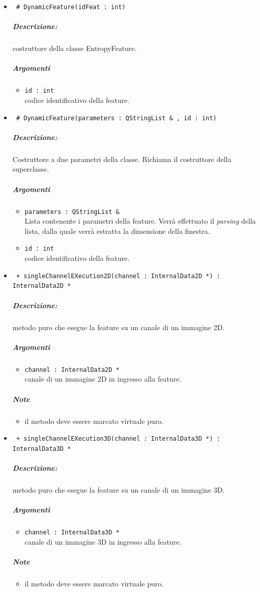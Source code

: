 	\begin{itemize}
	\item \color{blue}\verb! # DynamicFeature(idFeat : int)!
		\color{black}
		\subparagraph{Descrizione:} costruttore della classe EntropyFeature.
		\subparagraph{Argomenti}
			\begin{itemize}
				\item \color{RoyalPurple} \verb!id : int! \\ 
				\color{black} codice identificativo della feature\g{}.	
			\end{itemize}
			
	\item \color{blue}\verb! # DynamicFeature(parameters : QStringList & , id : int)!
		\color{black}
		\subparagraph{Descrizione:} Costruttore a due parametri della classe. Richiama il costruttore della 						superclasse.
		\subparagraph{Argomenti}
			\begin{itemize}	
				\item \color{RoyalPurple} \verb!parameters : QStringList &! \\ 
				\color{black} Lista contenente i parametri della feature\g{}. Verrà effettuato il \textit{parsing} 						della lista, dalla quale verrà estratta la dimensione della finestra.
				\item \color{RoyalPurple} \verb!id : int! \\ 
				\color{black} codice identificativo della feature\g{}.	
			\end{itemize}

	\item \color{blue}\verb! + singleChannelEXecution2D(channel : InternalData2D *) : InternalData2D *!
		\color{black}
		\subparagraph{Descrizione:} metodo puro che esegue la feature su un canale di un immagine 2D.
		\subparagraph{Argomenti}
			\begin{itemize}
				\item \color{RoyalPurple} \verb!channel : InternalData2D * ! \\ 
				\color{black} canale di un immagine 2D in ingresso alla feature.		
			\end{itemize}
		\subparagraph{Note}
			\begin{itemize}
				\item il metodo deve essere marcato virtuale puro.
			\end{itemize}
			
	\item \color{blue}\verb! + singleChannelEXecution3D(channel : InternalData3D *) : InternalData3D *!
		\color{black}
		\subparagraph{Descrizione:} metodo puro che esegue la feature su un canale di un immagine 3D.
		\subparagraph{Argomenti}
			\begin{itemize}
				\item \color{RoyalPurple} \verb!channel : InternalData3D * ! \\ 
				\color{black} canale di un immagine 3D in ingresso alla feature.		
			\end{itemize}
		\subparagraph{Note}
			\begin{itemize}
				\item il metodo deve essere marcato virtuale puro.
			\end{itemize}
			

\end{itemize}
